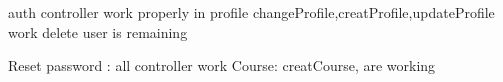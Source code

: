auth controller work properly 
in profile changeProfile,creatProfile,updateProfile work delete user is remaining

Reset password : all controller work
Course: creatCourse, are working